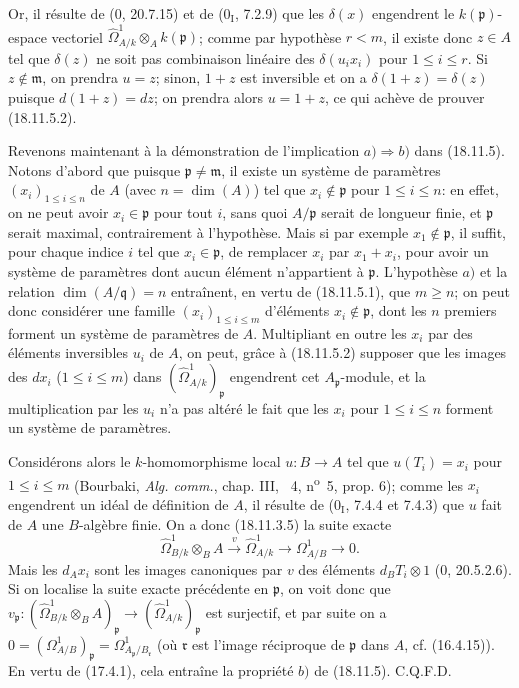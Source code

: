 
Or, il résulte de (0, 20.7.15) et de ($0_{\mathrm I}$, 7.2.9) que les $\delta(x)$ engendrent le $k(\mathfrak p)$-espace vectoriel $\hat{\Omega}^1_{A/k}\otimes_A k(\mathfrak p)$; comme par hypothèse $r<m$, il existe donc $z\in A$ tel que $\delta(z)$ ne soit pas combinaison linéaire des $\delta(u_ix_i)$ pour $1\leq i\leq r$. Si $z\notin\mathfrak m$, on prendra $u=z$; sinon, $1+z$ est inversible et on a $\delta(1+z)=\delta(z)$ puisque $d(1+z)=dz$; on prendra alors $u=1+z$, ce qui achève de prouver (18.11.5.2).

Revenons maintenant à la démonstration de l'implication $a)\Rightarrow b)$ dans (18.11.5). Notons d'abord que puisque $\mathfrak p\neq\mathfrak m$, il existe un système de paramètres $(x_i)_{1\leq i\leq n}$ de $A$ (avec $n=\dim(A)$) tel que $x_i\notin\mathfrak p$ pour $1\leq i\leq n$: en effet, on ne peut avoir $x_i\in\mathfrak p$ pour tout $i$, sans quoi $A/\mathfrak p$ serait de longueur finie, et $\mathfrak p$ serait maximal, contrairement à l'hypothèse. Mais si par exemple $x_1\notin\mathfrak p$, il suffit, pour chaque indice $i$ tel que $x_i\in\mathfrak p$, de remplacer $x_i$ par $x_1+x_i$, pour avoir un système de paramètres dont aucun élément n'appartient à $\mathfrak p$. L'hypothèse $a)$ et la relation $\dim(A/\mathfrak q)=n$ entraînent, en vertu de (18.11.5.1), que $m\geq n$; on peut donc considérer une famille $(x_i)_{1\leq i\leq m}$ d'éléments $x_i\notin\mathfrak p$, dont les $n$ premiers forment un système de paramètres de $A$. Multipliant en outre les $x_i$ par des éléments inversibles $u_i$ de $A$, on peut, grâce à (18.11.5.2) supposer que les images des $dx_i$ ($1\leq i\leq m$) dans $(\hat{\Omega}^1_{A/k})_{\mathfrak p}$ engendrent cet $A_{\mathfrak p}$-module, et la multiplication par les $u_i$ n'a pas altéré le fait que les $x_i$ pour $1\leq i\leq n$ forment un système de paramètres.

Considérons alors le $k$-homomorphisme local $u:B\to A$ tel que $u(T_i)=x_i$ pour $1\leq i\leq m$ (Bourbaki, \emph{Alg. comm.}, chap. III, \textsection~4, n\textsuperscript{o}~5, prop. 6); comme les $x_i$ engendrent un idéal de définition de $A$, il résulte de ($0_{\mathrm I}$, 7.4.4 et 7.4.3) que $u$ fait de $A$ une $B$-algèbre finie. On a donc (18.11.3.5) la suite exacte
\[
  \hat{\Omega}^1_{B/k}\otimes_B A\xrightarrow{v}\hat{\Omega}^1_{A/k}\longrightarrow\Omega^1_{A/B}\longrightarrow0.
\]
Mais les $d_Ax_i$ sont les images canoniques par $v$ des éléments $d_BT_i\otimes1$ (0, 20.5.2.6). Si on localise la suite exacte précédente en $\mathfrak p$, on voit donc que $v_{\mathfrak p}:(\hat{\Omega}^1_{B/k}\otimes_B A)_{\mathfrak p}\to(\hat{\Omega}^1_{A/k})_{\mathfrak p}$ est surjectif, et par suite on a $0=(\Omega^1_{A/B})_{\mathfrak p}=\Omega^1_{A_{\mathfrak p}/B_{\mathfrak r}}$ (où $\mathfrak r$ est l'image réciproque de $\mathfrak p$ dans $A$, cf. (16.4.15)). En vertu de (17.4.1), cela entraîne la propriété $b)$ de (18.11.5). C.Q.F.D.

